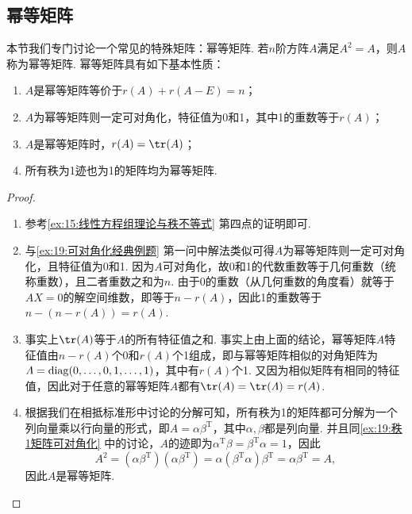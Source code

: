 \subsection{幂等矩阵}

本节我们专门讨论一个常见的特殊矩阵：幂等矩阵. 若$n$阶方阵$A$满足$A^2=A$，则$A$称为幂等矩阵. 幂等矩阵具有如下基本性质：
\begin{enumerate}
    \item $A$是幂等矩阵等价于$r(A)+r(A-E)=n$；

    \item $A$为幂等矩阵则一定可对角化，特征值为0和1，其中1的重数等于$r(A)$；

    \item $A$是幂等矩阵时，$r(A)=\tr(A)$；

    \item 所有秩为1迹也为1的矩阵均为幂等矩阵.
\end{enumerate}

\begin{proof}
    \begin{enumerate}
        \item 参考\autoref{ex:15:线性方程组理论与秩不等式} 第四点的证明即可.

        \item 与\autoref{ex:19:可对角化经典例题} 第一问中解法类似可得$A$为幂等矩阵则一定可对角化，且特征值为0和1. 因为$A$可对角化，故0和1的代数重数等于几何重数（统称重数），且二者重数之和为$n$. 由于0的重数（从几何重数的角度看）就等于$AX=0$的解空间维数，即等于$n-r(A)$，因此1的重数等于$n-(n-r(A))=r(A)$.

        \item 事实上$\tr(A)$等于$A$的所有特征值之和. 事实上由上面的结论，幂等矩阵$A$特征值由$n-r(A)$个0和$r(A)$个1组成，即与幂等矩阵相似的对角矩阵为$\varLambda=\operatorname{diag}(0,\ldots,0,1,\ldots,1)$，其中有$r(A)$个1. 又因为相似矩阵有相同的特征值，因此对于任意的幂等矩阵$A$都有$\tr(A)=\tr(\varLambda)=r(A)$.

        \item 根据我们在相抵标准形中讨论的分解可知，所有秩为1的矩阵都可分解为一个列向量乘以行向量的形式，即$A=\alpha\beta^\mathrm{T}$，其中$\alpha,\beta$都是列向量. 并且同\autoref{ex:19:秩1矩阵可对角化} 中的讨论，$A$的迹即为$\alpha^\mathrm{T}\beta=\beta^\mathrm{T}\alpha=1$，因此
              \[A^2=(\alpha\beta^\mathrm{T})(\alpha\beta^\mathrm{T})=\alpha(\beta^\mathrm{T}\alpha)\beta^\mathrm{T}=\alpha\beta^\mathrm{T}=A,\]
              因此$A$是幂等矩阵.
    \end{enumerate}
\end{proof}

